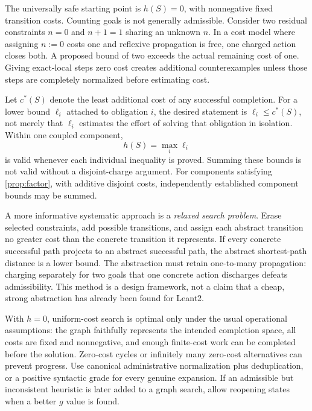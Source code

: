 
\answer The universally safe starting point is $h(S)=0$, with nonnegative fixed transition costs. Counting goals is not generally admissible. Consider two residual constraints $n=0$ and $n+1=1$ sharing an unknown $n$. In a cost model where assigning $n:=0$ costs one and reflexive propagation is free, one charged action closes both. A proposed bound of two exceeds the actual remaining cost of one. Giving exact-local steps zero cost creates additional counterexamples unless those steps are completely normalized before estimating cost.

Let $c^*(S)$ denote the least additional cost of any successful completion. For a lower bound $\ell_i$ attached to obligation $i$, the desired statement is $\ell_i\leq c^*(S)$, not merely that $\ell_i$ estimates the effort of solving that obligation in isolation. Within one coupled component,
\[
 h(S)=\max_i\ell_i
\]
is valid whenever each individual inequality is proved. Summing these bounds is not valid without a disjoint-charge argument. For components satisfying \cref{prop:factor}, with additive disjoint costs, independently established component bounds may be summed.

A more informative systematic approach is a \emph{relaxed search problem}. Erase selected constraints, add possible transitions, and assign each abstract transition no greater cost than the concrete transition it represents. If every concrete successful path projects to an abstract successful path, the abstract shortest-path distance is a lower bound. The abstraction must retain one-to-many propagation: charging separately for two goals that one concrete action discharges defeats admissibility. This method is a design framework, not a claim that a cheap, strong abstraction has already been found for Leant2.

With $h=0$, uniform-cost search is optimal only under the usual operational assumptions: the graph faithfully represents the intended completion space, all costs are fixed and nonnegative, and enough finite-cost work can be completed before the solution. Zero-cost cycles or infinitely many zero-cost alternatives can prevent progress. Use canonical administrative normalization plus deduplication, or a positive syntactic grade for every genuine expansion. If an admissible but inconsistent heuristic is later added to a graph search, allow reopening states when a better $g$ value is found.

